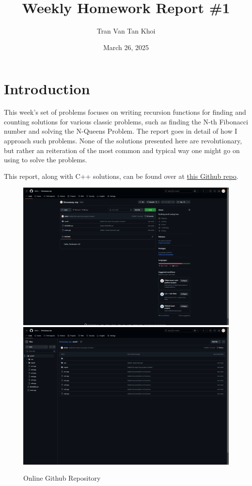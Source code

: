 \documentclass{article}
\author{Tran Van Tan Khoi}
\title{Weekly Homework Report \#1}
\date{March 26, 2025}
\begin{document}
    \maketitle

    \section{Introduction}
    
    This week's set of problems focuses on writing recursion functions for finding and counting solutions for various classic problems, such as finding the N-th Fibonacci number and solving the N-Queens Problem. The report goes in detail of how I approach such problems. None of the solutions presented here are revolutionary, but rather an reiteration of the most common and typical way one might go on using to solve the problems.


    This report, along with C++ solutions, can be found over at \href{https://github.com/xtrkoi/throwaway-rep}{this Github repo}.

    \begin{figure}[!h]
        \centering
        \includegraphics[width=12cm]{figure1.png}\hfil
        \includegraphics[width=12cm]{figure2.png}
        \caption{Online Github Repository}
    \end{figure}
\end{document}
